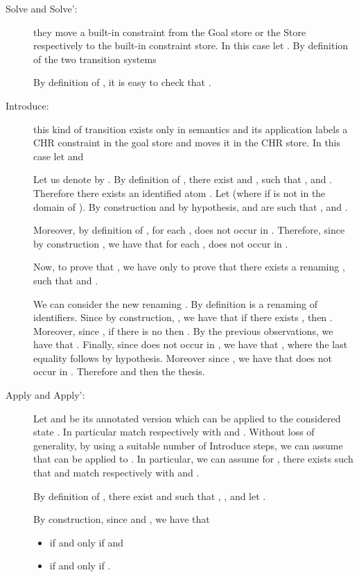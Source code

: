 \documentclass[final]{acmtrans2e}
\begin{document}
\begin{description}
\item[Solve and Solve':] they move a built-in constraint from the Goal store or the Store
respectively to the built-in constraint store. In this case let . By definition of the two transition systems

By definition of , it is easy to check that .


\item[Introduce:] this kind of transition exists only in  semantics and its
application labels a CHR constraint in the goal store and moves it in the CHR store.
In this case let  and


Let us denote  by .
By definition of ,  there exist  and , such that ,  and . Therefore
there exists an identified atom .
Let  (where  if  is not in the domain of ).
By construction and by hypothesis,  and  are such that ,  and .

Moreover, by definition of , for each ,  does not occur in . Therefore, since by construction , we have that for each ,  does not occur in .

Now, to prove that , we have only to prove that there exists a renaming , such that
 and .

We can consider the new renaming . By definition  is a renaming of identifiers.
Since by construction, , we have that if there exists , then . Moreover, since , if there is no  then .  By the previous observations, we have that .
Finally, since  does not occur in , we have that , where the last equality follows by hypothesis. Moreover  since , we have that  does  not occur in .
Therefore  and then the thesis.


\item[Apply and Apply':] Let  and
  be its annotated version which can
be applied to the considered state . In particular  match respectively with  and
. Without loss of generality, by using a suitable number of Introduce steps, we can assume that
 can be applied to . In particular, we can assume for , there exists  such that  and  match respectively with  and
.

By definition of , there exist  and  such that
,
,
 and  let .

By construction, since  and , we have that
\\
\begin{itemize}
\item  if and only if
 and
\item  if and only if
.
\end{itemize}



\end{description}
\end{document}
